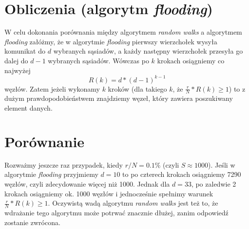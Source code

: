 \documentclass[10pt, a4paper]{article}
\begin{document}
\section*{Obliczenia (algorytm \textit{flooding})}
W celu dokonania porównania między algorytmem \textit{random walks} a algorytmem \textit{flooding} załóżmy, że w algorytmie \textit{flooding} pierwszy wierzchołek wysyła komunikat do $d$ wybranych sąsiadów, a każdy następny wierzchołek przesyła go dalej do $d-1$ wybranych sąsiadów. Wówczas po $k$ krokach osiągniemy co najwyżej
\begin{equation}
R(k) = d*(d − 1)^{k − 1}
\end{equation}
węzłów. Zatem jeżeli wykonamy $k$ kroków (dla takiego $k$, że $\frac{r}{N}*R(k) \geq 1 $) to z dużym prawdopodobieństwem znajdziemy węzeł, który zawiera poszukiwany element danych.
\section*{Porównanie}
Rozważmy jeszcze raz przypadek, kiedy  $r/N = 0.1\%$ (czyli $S \approx 1000$). Jeśli w algorytmie \textit{flooding} przyjmiemy $d=10$ to po czterech krokach  osiągniemy 7290 węzłów, czyli zdecydowanie więcej niż 1000. Jednak dla $d=33$, po zaledwie 2 krokach osiągniemy ok. 1000 węzłów i jednocześnie spełnimy warunek $\frac{r}{N}*R(k) \geq 1$. Oczywistą wadą algorytmu \textit{random walks} jest też to, że wdrażanie tego algorytmu może potrwać znacznie dłużej, zanim odpowiedź zostanie zwrócona.
\end{document}
